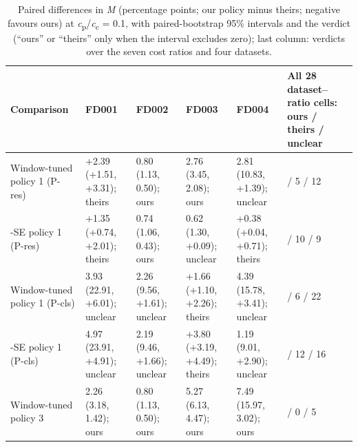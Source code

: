 \documentclass[a4paper,fleqn,doubleblind]{cas-dc}
\begin{document}
\begin{table}[!tbp]
\footnotesize\setlength{\tabcolsep}{4pt}
\caption{Paired differences in \textit{M} (percentage points; our policy minus theirs; negative favours ours) at \textit{c}\textsubscript{p}/\textit{c}\textsubscript{c} = 0.1, with paired-bootstrap 95\% intervals and the verdict (``ours'' or ``theirs'' only when the interval excludes zero); last column: verdicts over the seven cost ratios and four datasets.}
\begin{tabular}{@{}>{\raggedright\arraybackslash}p{}>{\raggedright\arraybackslash}p{}>{\raggedright\arraybackslash}p{}>{\raggedright\arraybackslash}p{}>{\raggedright\arraybackslash}p{}>{\raggedright\arraybackslash}p{}@{}}
\toprule
Comparison & FD001 & FD002 & FD003 & FD004 & All 28 dataset--ratio cells: ours / theirs / unclear \\
\midrule
Window-tuned \textminus{} policy 1 (P-res) & +2.39 (+1.51, +3.31); theirs & \textminus{}0.80 (\textminus{}1.13, \textminus{}0.50); ours & \textminus{}2.76 (\textminus{}3.45, \textminus{}2.08); ours & \textminus{}2.81 (\textminus{}10.83, +1.39); unclear & 11 / 5 / 12 \\
1-SE \textminus{} policy 1 (P-res) & +1.35 (+0.74, +2.01); theirs & \textminus{}0.74 (\textminus{}1.06, \textminus{}0.43); ours & \textminus{}0.62 (\textminus{}1.30, +0.09); unclear & +0.38 (+0.04, +0.71); theirs & 9 / 10 / 9 \\
Window-tuned \textminus{} policy 1 (P-cls) & \textminus{}3.93 (\textminus{}22.91, +6.01); unclear & \textminus{}2.26 (\textminus{}9.56, +1.61); unclear & +1.66 (+1.10, +2.26); theirs & \textminus{}4.39 (\textminus{}15.78, +3.41); unclear & 0 / 6 / 22 \\
1-SE \textminus{} policy 1 (P-cls) & \textminus{}4.97 (\textminus{}23.91, +4.91); unclear & \textminus{}2.19 (\textminus{}9.46, +1.66); unclear & +3.80 (+3.19, +4.49); theirs & \textminus{}1.19 (\textminus{}9.01, +2.90); unclear & 0 / 12 / 16 \\
Window-tuned \textminus{} policy 3 & \textminus{}2.26 (\textminus{}3.18, \textminus{}1.42); ours & \textminus{}0.80 (\textminus{}1.13, \textminus{}0.50); ours & \textminus{}5.27 (\textminus{}6.13, \textminus{}4.47); ours & \textminus{}7.49 (\textminus{}15.97, \textminus{}3.02); ours & 23 / 0 / 5 \\

\end{tabular}
\end{table}
\end{document}
